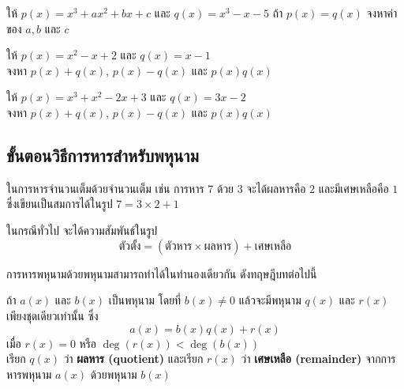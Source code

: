 \begin{examplebox}
	ให้ $p(x) = x^3 + ax^2 + bx + c$ และ $q(x) = x^3 - x - 5$ ถ้า $p(x) = q(x)$ จงหาค่าของ $a, b$ และ $c$
\end{examplebox}
\solution 

\newpage
\begin{examplebox}
	ให้ $p(x) = x^2 - x + 2$ และ $q(x) = x - 1$ \\
	จงหา $p(x) + q(x)$, $p(x) - q(x)$ และ $p(x)q(x)$
\end{examplebox}
\solution 

\vspace{7cm}
\begin{examplebox}
ให้ $p(x) = x^3 + x^2 - 2x + 3$ และ $q(x) = 3x - 2$ \\
    จงหา $p(x) + q(x)$, $p(x) - q(x)$ และ $p(x)q(x)$
\end{examplebox}
\solution

\newpage



\subsection*{ขั้นตอนวิธีการหารสำหรับพหุนาม}

ในการหารจำนวนเต็มด้วยจำนวนเต็ม เช่น การหาร $7$ ด้วย $3$ จะได้ผลหารคือ $2$ และมีเศษเหลือคือ $1$ ซึ่งเขียนเป็นสมการได้ในรูป $7 = 3 \times 2 + 1$

ในกรณีทั่วไป จะได้ความสัมพันธ์ในรูป
\begin{equation*}
	\text{ตัวตั้ง} = (\text{ตัวหาร} \times \text{ผลหาร}) + \text{เศษเหลือ}
\end{equation*}

การหารพหุนามด้วยพหุนามสามารถทำได้ในทำนองเดียวกัน ดังทฤษฎีบทต่อไปนี้

\begin{theorembox} \label{thm1}
	ถ้า $a(x)$ และ $b(x)$ เป็นพหุนาม โดยที่ $b(x) \neq 0$ แล้วจะมีพหุนาม $q(x)$ และ $r(x)$ เพียงชุดเดียวเท่านั้น ซึ่ง
	\begin{equation*}
		a(x) = b(x)q(x) + r(x)
	\end{equation*}
	เมื่อ $r(x) = 0$ หรือ $\operatorname{deg}(r(x)) < \operatorname{deg}(b(x))$
	\\[0.5em]
	เรียก $q(x)$ ว่า \textbf{ผลหาร (quotient)} และเรียก $r(x)$ ว่า \textbf{เศษเหลือ (remainder)} จากการหารพหุนาม $a(x)$ ด้วยพหุนาม $b(x)$
\end{theorembox}


